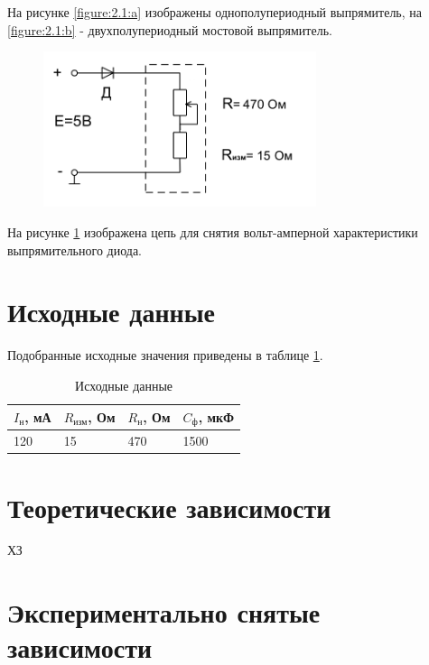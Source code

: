 На рисунке \ref{figure:2.1:a} изображены однополупериодный выпрямитель, на \ref{figure:2.1:b} - двухполупериодный мостовой выпрямитель.

\begin{figure}[H]
	\begin{center}
		\includegraphics[width=8cm]{img/vah}
		\caption{}
		\label{figure:2.2} %
	\end{center}
\end{figure}

На рисунке \ref{figure:2.2} изображена цепь для снятия вольт-амперной характеристики выпрямительного диода.

\section{Исходные данные}

Подобранные исходные значения приведены в таблице \ref{tabular:11}.

\begin{table}[H]
	\begin{center}
	\caption{Исходные данные}
	\def\arraystretch{1.5}
		\begin{tabularx}{\textwidth}{|X|X|X|X|}
			\hline
			$I_\text{н}$, мА & $R_\text{изм}$, Ом & $R_\text{н}$, Ом & $C_\text{ф}$, мкФ \\ \hline
		    120 & 15 & 470 & 1500 \\\hline	
		\end{tabularx}
		\label{tabular:11}
	\end{center}
\end{table}

\section{Теоретические зависимости}

ХЗ

\section{Экспериментально снятые зависимости}

